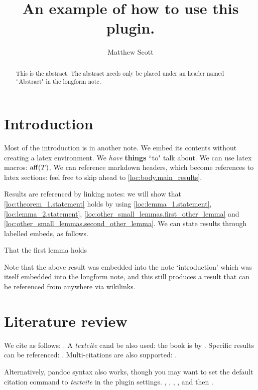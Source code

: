 \documentclass{article}
\title{An example of how to use this plugin.}
\author{Matthew Scott}
\begin{document}
\maketitle
\begin{abstract}
This is the abstract. The abstract needs only be placed under an header named ``Abstract" in the longform note.
\end{abstract}
\section{Introduction}
\label{loc:body.introduction}
Most of the introduction is in another note. We embed its contents without creating a latex environment.
We \emph{have} \textbf{things} ``to" talk about. We can use latex macros: $\operatorname{aff}(T)$. We can reference markdown headers, which become references to latex sections: feel free to skip ahead to \cref{loc:body.main_results}.

Results are referenced by linking notes: we will show that \cref{loc:theorem_1.statement} holds by using \cref{loc:lemma_1.statement}, \cref{loc:lemma_2.statement}, \cref{loc:other_small_lemmas.first_other_lemma} and \cref{loc:other_small_lemmas.second_other_lemma}. We can state results through labelled embeds, as follows. 
\begin{lemma}
\label{loc:other_small_lemmas.second_other_lemma}
That the first lemma holds
\end{lemma}
Note that the above result was embedded into the note `introduction' which was itself embedded into the longform note, and this still produces a result that can be referenced from anywhere via wikilinks.
\section{Literature review}
\label{loc:body.literature_review}
We cite as follows: \cite{vershyninHighDimensionalProbabilityIntroduction2018}. A \emph{textcite} cand be also used: the book is by \textcite{vershyninHighDimensionalProbabilityIntroduction2018}. Specific results can be referenced: \cite[Example 5.4]{vershyninHighDimensionalProbabilityIntroduction2018}. Multi-citations are also supported: \cite{berkCoherenceParameterCharacterizing2022, berkModeladaptedFourierSampling2023}.

Alternatively, pandoc syntax also works, though you may want to set the default citation command to \emph{textcite} in the plugin settings. \cite{vershyninHighDimensionalProbabilityIntroduction2018}, \cite{vershyninHighDimensionalProbabilityIntroduction2018}, \cite[Example 2.1]{vershyninHighDimensionalProbabilityIntroduction2018}, \cite{berkCoherenceParameterCharacterizing2022, berkModeladaptedFourierSampling2023}, and then \cite{vershyninHighDimensionalProbabilityIntroduction2018}.
\end{document}
